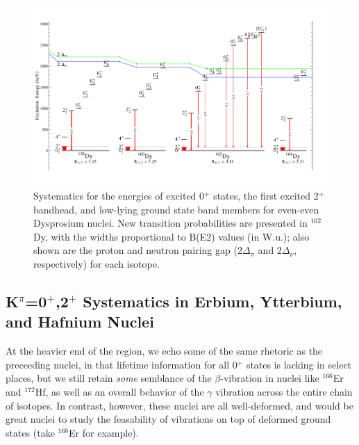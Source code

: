 \begin{landscape}
\begin{figure}[ht] 
\begin{center}
\includegraphics[height=0.8\textheight]{SciDraw_DySystematics.pdf}
\caption{Systematics for the energies of excited 0$^+$ states, the first excited 2$^+$ bandhead, and low-lying ground state band members for even-even Dysprosium nuclei. New transition probabilities are presented in $^{162}$Dy, with the widths proportional to B(E2) values (in W.u.); also shown are the proton and neutron pairing gap (2$\Delta_\pi$ and 2$\Delta_\nu$, respectively) for each isotope.
\label{fig:DySystematics}}
\end{center}
\end{figure}
\end{landscape}

\subsection{K$^\pi$=0$^+$,2$^+$ Systematics in Erbium, Ytterbium, and Hafnium Nuclei}
At the heavier end of the region, we echo some of the same rhetoric as the preceeding nuclei, in that lifetime information for all 0$^+$ states is lacking in select places, but we still retain \textit{some} semblance of the $\beta$-vibration in nuclei like $^{166}$Er and $^{172}$Hf, as well as an overall behavior of the $\gamma$ vibration across the entire chain of isotopes. In contrast, however, these nuclei are all well-deformed, and would be great nuclei to study the feasability of vibrations on top of deformed ground states (take $^{168}$Er for example).

